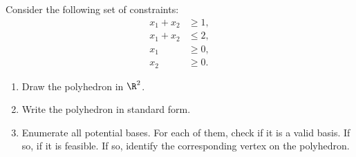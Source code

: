 

Consider the following set of constraints:
\begin{align*}
x_1+x_2 & \geq 1,\\
x_1+x_2 & \leq 2,\\
x_1 & \geq 0,\\
x_2 & \geq 0.
\end{align*}

\begin{enumerate}
\item Draw the polyhedron in $\R^2$.
\item Write the polyhedron in standard form.
\item Enumerate all potential bases. For each of them, check if it is
  a valid basis. If so, if it is feasible. If so, identify the
  corresponding vertex on the polyhedron.
\end{enumerate}


